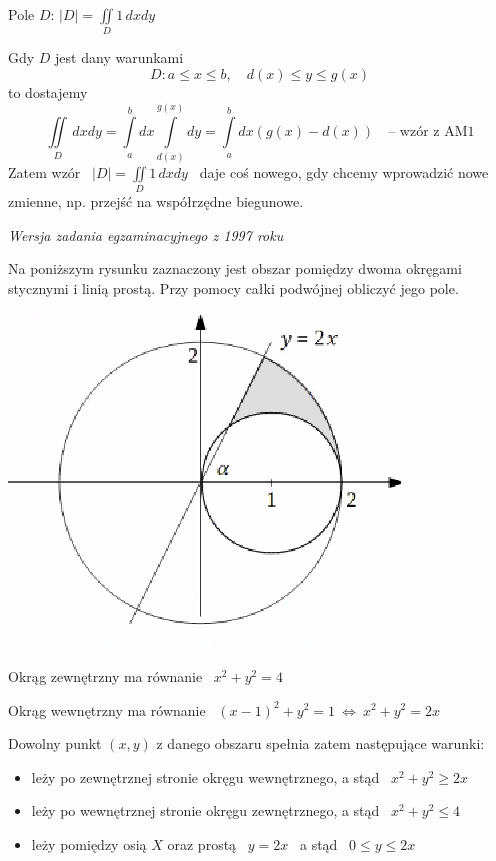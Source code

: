 Pole $D$: $ |D| = \iint\limits_D 1 \, dxdy $

Gdy $D$ jest dany warunkami
\[ D : a \leq x \leq b, \quad d(x) \leq y \leq g(x) \]
to dostajemy
\[ \iint\limits_D \, dxdy = \int\limits_{a}^{b} dx \int\limits_{d(x)}^{g(x)} dy = \int\limits_{a}^{b} dx (g(x) - d(x)) \quad \text{-- wzór z AM1} \]
Zatem wzór \ $ |D| = \iint\limits_D 1 \, dxdy $ \ daje coś nowego, gdy chcemy wprowadzić nowe zmienne, np. przejść na współrzędne biegunowe.

\begin{przykladbig}
    \textit{Wersja zadania egzaminacyjnego z 1997 roku} \medskip

    Na poniższym rysunku zaznaczony jest obszar pomiędzy dwoma okręgami stycznymi i linią prostą.
    Przy pomocy całki podwójnej obliczyć jego pole.

    \begin{center}
        \includegraphics[scale=0.5]{img/egzamokrag.png}
    \end{center}

    Okrąg zewnętrzny ma równanie \ $ x^2 + y^2 = 4 $

    Okrąg wewnętrzny ma równanie \ $ (x-1)^2 + y^2 = 1 \ \Leftrightarrow \ x^2 + y^2 = 2x $

    Dowolny punkt $(x,y)$ z danego obszaru spełnia zatem następujące warunki:
    \begin{itemize}
        \item leży po zewnętrznej stronie okręgu wewnętrznego, a stąd \ $ x^2 + y^2 \geq 2x $
        \item leży po wewnętrznej stronie okręgu zewnętrznego, a stąd \ $ x^2 + y^2 \leq 4 $
        \item leży pomiędzy osią $X$ oraz prostą \ $ y = 2x $ \ a stąd \ $ 0 \leq y \leq 2x $
    \end{itemize}


\end{przykladbig}
